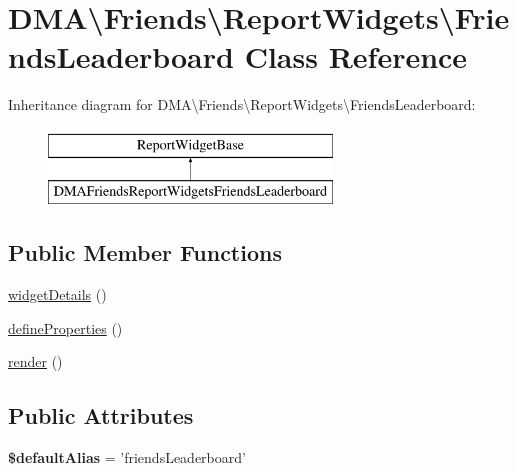 \hypertarget{classDMA_1_1Friends_1_1ReportWidgets_1_1FriendsLeaderboard}{\section{D\+M\+A\textbackslash{}Friends\textbackslash{}Report\+Widgets\textbackslash{}Friends\+Leaderboard Class Reference}
\label{classDMA_1_1Friends_1_1ReportWidgets_1_1FriendsLeaderboard}
}
Inheritance diagram for D\+M\+A\textbackslash{}Friends\textbackslash{}Report\+Widgets\textbackslash{}Friends\+Leaderboard\+:\begin{figure}[H]
\begin{center}
\leavevmode
\includegraphics[height=2.000000cm]{dd/dbd/classDMA_1_1Friends_1_1ReportWidgets_1_1FriendsLeaderboard}
\end{center}
\end{figure}
\subsection*{Public Member Functions}
\begin{DoxyCompactItemize}
\item 
\hyperlink{classDMA_1_1Friends_1_1ReportWidgets_1_1FriendsLeaderboard_ac5fc1d8631aca255dee64a37ddeed5f6}{widget\+Details} ()
\item 
\hyperlink{classDMA_1_1Friends_1_1ReportWidgets_1_1FriendsLeaderboard_a8a2b873a91fc33c558834423e35da4bc}{define\+Properties} ()
\item 
\hyperlink{classDMA_1_1Friends_1_1ReportWidgets_1_1FriendsLeaderboard_acc5889523847a95eb855e6041c5ef92f}{render} ()
\end{DoxyCompactItemize}
\subsection*{Public Attributes}
\begin{DoxyCompactItemize}
\item 
\hypertarget{classDMA_1_1Friends_1_1ReportWidgets_1_1FriendsLeaderboard_ab1f836744d59c96df00f1fad2cddb01f}{{\bfseries \$default\+Alias} = 'friends\+Leaderboard'}\label{classDMA_1_1Friends_1_1ReportWidgets_1_1FriendsLeaderboard_ab1f836744d59c96df00f1fad2cddb01f}

\end{DoxyCompactItemize}


